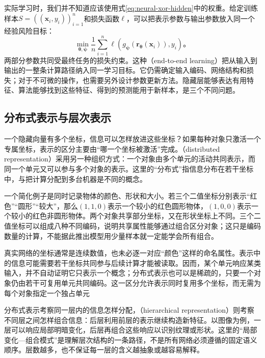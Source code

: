 实际学习时，我们并不知道应该使用式\eqref{eq:neural-xor-hidden}中的权重。给定训练样本$S=((\bm{x}_i,y_i))_{i=1}^{n}$和损失函数$\ell$，可以把表示参数与输出参数放入同一个经验风险目标：
\begin{equation}
  \min_{\bm{\theta},\bm{\psi}}
  \frac{1}{n}\sum_{i=1}^{n}
  \ell\!\left(g_{\bm{\psi}}(\bm{r}_{\bm{\theta}}(\bm{x}_i)),y_i\right)\text{。}
  \label{eq:neural-joint-learning}
\end{equation}
两部分参数共同受最终任务的损失约束。这种（end-to-end learning）把从输入到输出的一整条计算路径纳入同一学习目标。它仍需确定输入编码、网络结构和损失；对于不可微的操作，也需要另外设计参数更新方法。隐藏层能够表达有用特征、算法能够找到这些特征、得到的预测能用于新样本，是三个不同问题。

\subsection{分布式表示与层次表示}
\label{sec:neural-distributed-hierarchical}

一个隐藏向量有多个坐标，信息可以怎样放进这些坐标？如果每种对象只激活一个专属坐标，表示的区分主要由“哪一个坐标被激活”完成。（distributed representation）采用另一种组织方式：一个对象由多个单元的活动共同表示，而同一个单元又可以参与多个对象的表示。这里的“分布式”指信息分布在若干坐标中，与把计算分配到多台机器是不同的概念。

一个简化例子是同时记录物体的颜色、形状和大小。若三个二值坐标分别表示“红色”“圆形”“较大”，那么$(1,1,0)$表示一个较小的红色圆形物体，$(1,0,0)$表示一个较小的红色非圆形物体。两个对象共享部分坐标，又在形状坐标上不同。三个二值坐标可以组成八种不同编码，说明共享属性能够通过组合区分对象；这只是编码数量的计算，不能据此推出模型用少量样本就一定能学会所有组合。

真实网络的坐标通常是连续数值，也未必逐一对应“颜色”这样的命名属性。表示中的信息可能需要若干坐标共同参与后续计算才能被读取。因而，某个单元响应某类输入，并不自动证明它只表示一个概念；分布式表示也可以是稀疏的，只要一个对象仍由若干可复用单元共同编码。这一区分允许表示同时复用多个坐标，而无需为每个对象指定一个独占单元

分布式表示考察同一层内的信息怎样分配，（hierarchical representation）则考察不同层之间怎样组合信息：后层利用前层的表示继续构造新特征。以图像为例，一层可以响应局部明暗变化，后层再组合这些响应以识别纹理或形状。这里的“局部变化—组合模式”是理解层次结构的一条路径，不是所有网络必须遵循的固定语义顺序。层数越多，也不保证每一层的含义越抽象或越容易解释。

